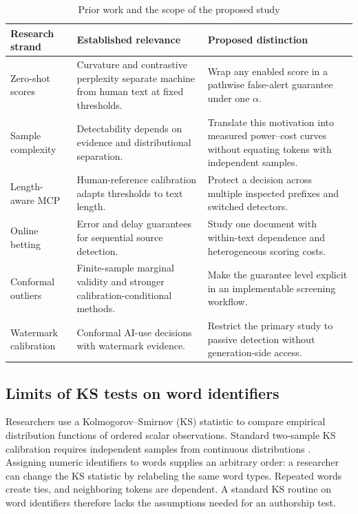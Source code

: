 \documentclass[pdflatex,sn-mathphys-num]{sn-jnl}
\begin{document}
\begin{table}[t]
\caption{Prior work and the scope of the proposed study}\label{tab:position}
\small
\begin{tabularx}{\textwidth}{@{}>{\raggedright\arraybackslash}p{}YY@{}}
\toprule
Research strand & Established relevance & Proposed distinction \\
\midrule
Zero-shot scores \citep{mitchell2023,bao2024,hans2024} & Curvature and contrastive perplexity separate machine from human text at fixed thresholds. & Wrap any enabled score in a pathwise false-alert guarantee under one \(\alpha\). \\
Sample complexity \citep{chakraborty2024} & Detectability depends on evidence and distributional separation. & Translate this motivation into measured power--cost curves without equating tokens with independent samples. \\
Length-aware MCP \citep{zhu2025} & Human-reference calibration adapts thresholds to text length. & Protect a decision across multiple inspected prefixes and switched detectors. \\
Online betting \citep{chen2025} & Error and delay guarantees for sequential source detection. & Study one document with within-text dependence and heterogeneous scoring costs. \\
Conformal outliers \citep{bates2023} & Finite-sample marginal validity and stronger calibration-conditional methods. & Make the guarantee level explicit in an implementable screening workflow. \\
Watermark calibration \citep{xie2026} & Conformal AI-use decisions with watermark evidence. & Restrict the primary study to passive detection without generation-side access. \\
\bottomrule
\end{tabularx}
\end{table}

\subsection{Limits of KS tests on word identifiers}

Researchers use a Kolmogorov--Smirnov (KS) statistic to compare empirical distribution functions of ordered scalar observations. Standard two-sample KS calibration requires independent samples from continuous distributions \citep{scipyks}. Assigning numeric identifiers to words supplies an arbitrary order: a researcher can change the KS statistic by relabeling the same word types. Repeated words create ties, and neighboring tokens are dependent. A standard KS routine on word identifiers therefore lacks the assumptions needed for an authorship test.
\end{document}
